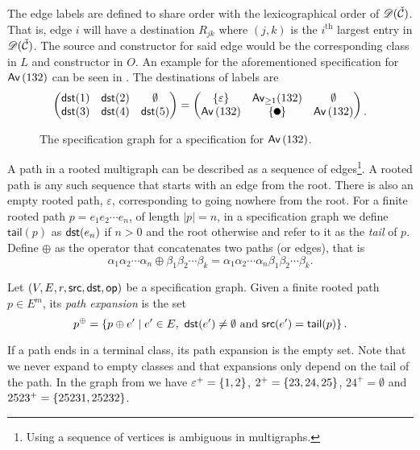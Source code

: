 The edge labels are defined to share order with the lexicographical order of $\mathscr{D}(\check{\mathcal{C}})$. That is, edge $i$ will have a destination $R_{jk}$  where $(j,k)$ is the $i^\text{th}$ largest entry in $\mathscr{D}(\check{\mathcal{C}})$. The source and constructor for said edge would be the corresponding class in $L$ and constructor in $O$. An example for the aforementioned specification for $\textsf{Av}\left(132\right)$ can be seen in . The destinations of labels are
\[
    \begin{pmatrix}
        \dst(1) & \dst(2) & \emptyset\\
        \dst(3) & \dst(4) & \dst(5)
    \end{pmatrix}
    =
    \begin{pmatrix}
    \set{\varepsilon} & \textsf{Av}_{\geq1}(132) & \emptyset \\
    \Av{132} & \set{\point{0.1}} & \Av{132}
    \end{pmatrix}
    \begin{matrix}\\.\end{matrix}
\]

\begin{figure}[ht!]
    \centering
    
    \caption{The specification graph for a specification for $\textsf{Av}\left(132\right)$.}
    \label{fig:specgraph132}
\end{figure}

A path in a rooted multigraph can be described as a sequence of edges\footnote{Using a sequence of vertices is ambiguous in multigraphs.}. A rooted path is any such sequence that starts with an edge from the root. There is also an empty rooted path, $\varepsilon$, corresponding to going nowhere from the root. For a finite rooted path $p=e_1e_2\dotsm e_n$, of length $|p|=n$, in a specification graph we define $\textsf{tail}(p)$ as $\textsf{dst}(e_n)$ if $n>0$ and the root otherwise and refer to it as the \emph{tail} of $p$. Define $\oplus$ as the operator that concatenates two paths (or edges), that is
\[
    \alpha_1\alpha_2 \dotsm \alpha_n \oplus \beta_1\beta_2 \dotsm \beta_k = \alpha_1\alpha_2 \dotsm \alpha_n\beta_1\beta_2 \dotsm \beta_k.
\]

\begin{definition}
Let $(V,E,r,\textsf{src},\textsf{dst},\textsf{op})$ be a specification graph. Given a finite rooted path $p \in E^m$, its \emph{path expansion} is the set 
\[
    p^\oplus = \cset{p \oplus e'}{e' \in E, \ \dst(e') \neq \emptyset \text{ and } \src(e') = \textsf{tail}(p)}.
\]
\end{definition}
If a path ends in a terminal class, its path expansion is the empty set. Note that we never expand to empty classes and that expansions only depend on the tail of the path. In the graph from  we have $\varepsilon^+ = \left\{1,2\right\}$, $2^+ = \left\{23,24,25\right\}$, $24^+ = \emptyset$ and $2523^+ = \left\{25231, 25232\right\}$.


